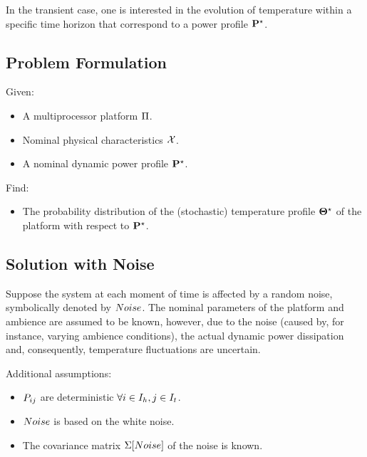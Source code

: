In the transient case, one is interested in the evolution of temperature within a specific time horizon that correspond to a power profile $\mathbf{P}^\star$.

\subsection{Problem Formulation}
Given:
\begin{itemize}
  \item A multiprocessor platform $\Pi$.
  \item Nominal physical characteristics $\mathcal{X}$.
  \item A nominal dynamic power profile $\mathbf{P}^\star$.
\end{itemize}

Find:
\begin{itemize}
  \item The probability distribution of the (stochastic) temperature profile $\mathbf{\Theta}^\star$ of the platform with respect to $\mathbf{P}^\star$.
\end{itemize}

\subsection{Solution with Noise}
Suppose the system at each moment of time is affected by a random noise, symbolically denoted by $Noise$. The nominal parameters of the platform and ambience are assumed to be known, however, due to the noise (caused by, for instance, varying ambience conditions), the actual dynamic power dissipation and, consequently, temperature fluctuations are uncertain.

Additional assumptions:
\begin{itemize}
  \item $P_{ij}$ are deterministic $\forall i \in I_h, j \in I_t$.
  \item $Noise$ is based on the white noise.
  \item The covariance matrix $\Sigma[Noise]$ of the noise is known.
\end{itemize}

